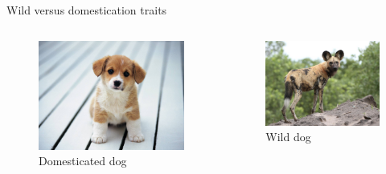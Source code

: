 \documentclass[ignorenonframetext,aspectratio=169]{beamer}
\begin{document}
\begin{frame}{Wild versus domestication traits}
\protect\hypertarget{wild-versus-domestication-traits}{}

\begin{columns}[T,onlytextwidth]
  
  
\begin{figure}
\includegraphics[width=0.8\linewidth]{./../images/domestic_dog_puppy} \caption{Domesticated dog}\label{fig:domesticated}
\end{figure}


\begin{figure}
\includegraphics[width=0.8\linewidth]{./../images/wild_dog_african} \caption{Wild dog}\label{fig:wild}
\end{figure}

\end{columns}

\end{frame}
\end{document}
